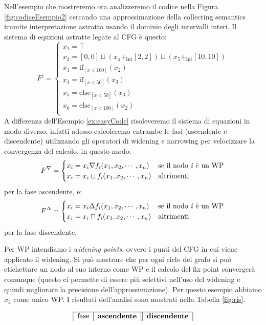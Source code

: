 \begin{example}\label{ex:esempio2}
Nell'esempio che mostreremo ora analizzeremo il codice nella Figura \ref{fig:codiceEsempio2} cercando una approssimazione della collecting semantics tramite interpretazione astratta usando il dominio degli intervalli interi. Il sistema di equzioni astratte legate al CFG è questo:
\[
F^{\natural}=
\begin{cases}
    x_1 = \top \\
    x_2 = [0, 0]\sqcup(x_4 +_{\textrm{Int}} [2, 2])\sqcup(x_5 +_{\textrm{Int}} [10, 10]) \\
    x_3 = \textrm{if}_{[x<100]}(x_2) \\
    x_4 = \textrm{if}_{[x<50]}(x_3) \\
    x_5 = \textrm{else}_{[x<50]}(x_3) \\
    x_6 = \textrm{else}_{[x<100]}(x_2) \\
\end{cases}
\]  
A differenza dell'Esempio \ref{ex:easyCode} risoleveremo il sistema di equazioni in modo diverso, infatti adesso calcoleremo entrambe le fasi (ascendente e discendente) utilizzando gli operatori di widening e narrowing per velocizzare la convergenza del calcolo, in questo modo: 
\[
F^{\nabla} = 
\begin{cases}
    x_i = x_i \nabla f_i(x_1, x_2, \cdots, x_n) & \textrm{se il nodo \textit{i} è un WP} \\
    x_i = x_i \sqcup f_i(x_1, x_2, \cdots, x_n) & \textrm{altrimenti} \\
\end{cases}
\]
per la fase ascendente, e:
\[
F^{\Delta} = 
\begin{cases}
    x_i = x_i \Delta f_i(x_1, x_2, \cdots, x_n) & \textrm{se il nodo \textit{i} è un WP} \\
    x_i = x_i \sqcap f_i(x_1, x_2, \cdots, x_n) & \textrm{altrimenti} \\
\end{cases}
\]
per la fase discendente.

Per WP intendiamo i \textit{widening points}, ovvero i punti del CFG in cui viene applicato il widening. Si può mostrare che per ogni ciclo del grafo si può etichettare un nodo al suo interno come WP e il calcolo del fix-point convergerà comunque (questo ci permette di essere più selettivi nell'uso del widening e quindi migliorare la precisione dell'approssimazione). Per questo esempio abbiamo \(x_3\) come unico WP.
I risultati dell'analisi sono mostrati nella Tabella \ref{fig:ris}. 
\begin{table}
\begin{minipage}{\textwidth}
    \centering
    \vspace{1cm}
        \[
        \begin{tabular}{|c|c|c|c|c||c|c|c||}
        \hline
        \multicolumn{2}{|c|}{fase} & 
        \multicolumn{3}{c||}{\textbf{ascendente}} & 
        \multicolumn{2}{c|}{\textbf{discendente}}\\
        

\end{tabular}\]
\end{minipage}
\end{table}
\end{example}
